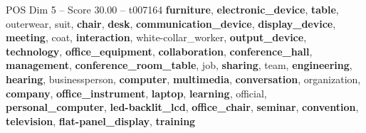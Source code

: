 \begin{textsample}{POS Dim 5 – Score 30.00 – t007164}  \label{ex:f5_pos_021}
\textbf{furniture}, \textbf{electronic\_device}, \textbf{table}, outerwear, suit, \textbf{chair}, \textbf{desk}, \textbf{communication\_device}, \textbf{display\_device}, \textbf{meeting}, coat, \textbf{interaction}, white-collar\_worker, \textbf{output\_device}, \textbf{technology}, \textbf{office\_equipment}, \textbf{collaboration}, \textbf{conference\_hall}, \textbf{management}, \textbf{conference\_room\_table}, job, \textbf{sharing}, team, \textbf{engineering}, \textbf{hearing}, businessperson, \textbf{computer}, \textbf{multimedia}, \textbf{conversation}, organization, \textbf{company}, \textbf{office\_instrument}, \textbf{laptop}, \textbf{learning}, official, \textbf{personal\_computer}, \textbf{led-backlit\_lcd}, \textbf{office\_chair}, \textbf{seminar}, \textbf{convention}, \textbf{television}, \textbf{flat-panel\_display}, \textbf{training}

\end{textsample}
